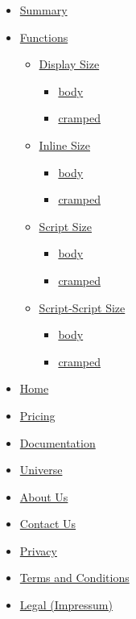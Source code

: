 \begin{itemize}
\tightlist
\item
  \hyperref[summary]{Summary}
\item
  \hyperref[functions]{Functions}

  \begin{itemize}
  \tightlist
  \item
    \hyperref[functions-display]{Display Size}

    \begin{itemize}
    \tightlist
    \item
      \hyperref[functions-display-body]{body}
    \item
      \hyperref[functions-display-cramped]{cramped}
    \end{itemize}
  \item
    \hyperref[functions-inline]{Inline Size}

    \begin{itemize}
    \tightlist
    \item
      \hyperref[functions-inline-body]{body}
    \item
      \hyperref[functions-inline-cramped]{cramped}
    \end{itemize}
  \item
    \hyperref[functions-script]{Script Size}

    \begin{itemize}
    \tightlist
    \item
      \hyperref[functions-script-body]{body}
    \item
      \hyperref[functions-script-cramped]{cramped}
    \end{itemize}
  \item
    \hyperref[functions-sscript]{Script-Script Size}

    \begin{itemize}
    \tightlist
    \item
      \hyperref[functions-sscript-body]{body}
    \item
      \hyperref[functions-sscript-cramped]{cramped}
    \end{itemize}
  \end{itemize}
\end{itemize}

\begin{itemize}
\tightlist
\item
  \href{/}{Home}
\item
  \href{/pricing/}{Pricing}
\item
  \href{/docs/}{Documentation}
\item
  \href{/universe/}{Universe}
\item
  \href{/about/}{About Us}
\item
  \href{/contact/}{Contact Us}
\item
  \href{/privacy/}{Privacy}
\item
  \href{https://typst.app/terms}{Terms and Conditions}
\item
  \href{/legal/}{Legal (Impressum)}
\end{itemize}

